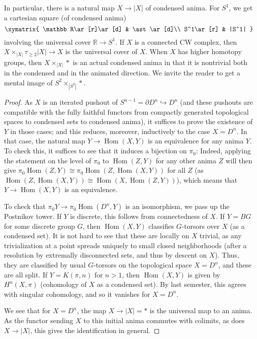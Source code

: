 \documentclass[11pt]{amsbook}
\DeclareMathOperator{\Hom}{Hom}
\numberwithin{equation}{section}
\numberwithin{theorem}{section}
\theoremstyle{definition}
\begin{document}
In particular, there is a natural map $X\to|X|$ of condensed anima. For $S^1$, we get a cartesian square (of condensed anima)
\[\xymatrix{
\mathbb R\ar[r]\ar[d] & \ast\ar[d]\\
S^1\ar[r] & |S^1|
}\]
involving the universal cover $\mathbb R\to S^1$. If $X$ is a connected CW complex, then $X\times_{|X|} \tau_{\geq 2} |X|\to X$ is the universal cover of $X$. When $X$ has higher homotopy groups, then $X\times_{|X|} \ast$ is an actual condensed anima in that it is nontrivial both in the condensed and in the animated direction. We invite the reader to get a mental image of $S^2\times_{|S^2|} \ast$.

\begin{proof} As $X$ is an iterated pushout of $S^{n-1}=\partial D^n\hookrightarrow D^n$ (and these pushouts are compatible with the fully faithful functors from compactly generated topological spaces to condensed sets to condensed anima), it suffices to prove the existence of $Y$ in those cases; and this reduces, moreover, inductively to the case $X=D^n$. In that case, the natural map $Y\to \Hom(X,Y)$ is an equivalence for any anima $Y$. To check this, it suffices to see that it induces a bijection on $\pi_0$: Indeed, applying the statement on the level of $\pi_0$ to $\Hom(Z,Y)$ for any other anima $Z$ will then give $\pi_0\Hom(Z,Y)\cong \pi_0 \Hom(Z,\Hom(X,Y))$ for all $Z$ (as $\Hom(Z,\Hom(X,Y))\cong \Hom(X,\Hom(Z,Y))$), which means that $Y\to \Hom(X,Y)$ is an equivalence.

To check that $\pi_0 Y\to \pi_0 \Hom(D^n,Y)$ is an isomorphism, we pass up the Postnikov tower. If $Y$ is discrete, this follows from connectedness of $X$. If $Y=BG$ for some discrete group $G$, then $\Hom(X,Y)$ classifies $G$-torsors over $X$ (as a condensed set). It is not hard to see that these are locally on $X$ trivial, as any trivialization at a point spreads uniquely to small closed neighborhoods (after a resolution by extremally disconnected sets, and thus by descent on $X$). Thus, they are classified by usual $G$-torsors on the topological space $X=D^n$, and these are all split. If $Y=K(\pi,n)$ for $n>1$, then $\Hom(X,Y)$ is given by $H^n(X,\pi)$ (cohomology of $X$ as a condensed set). By last semester, this agrees with singular cohomology, and so it vanishes for $X=D^n$.

We see that for $X=D^n$, the map $X\to |X|=\ast$ is the universal map to an anima. As the functor sending $X$ to this initial anima commutes with colimits, as does $X\to |X|$, this gives the identification in general.
\end{proof}
\end{document}
